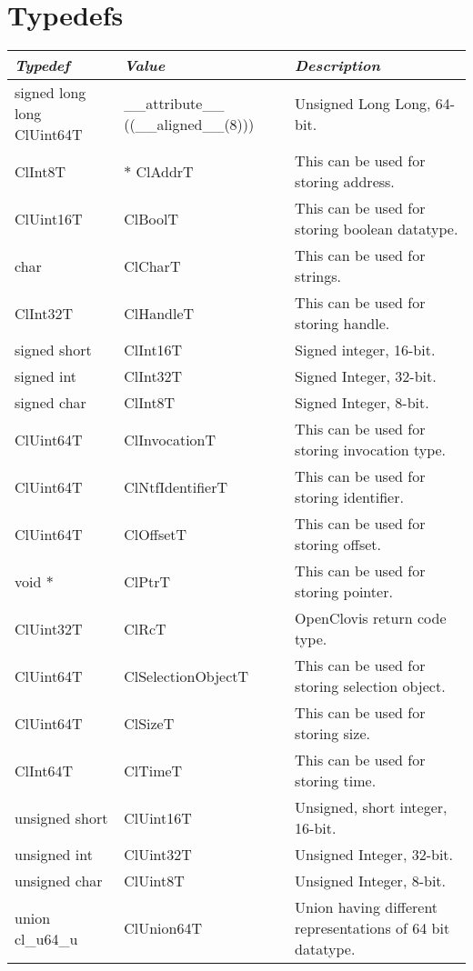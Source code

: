 \section{Typedefs}
\begin{tabular}{|p{2in}|p{1in}|p{2in}|} \hline
\textbf{\textit{Typedef}} &\textbf{\textit{Value}} &\textbf{\textit{Description}} \\\hline
signed long long Cl\-Uint64T &\_\-\_\-attribute\_\-\_\- ((\_\-\_\-aligned\_\-\_\-(8))) &Unsigned Long Long, 64-bit.\\
Cl\-Int8T &$\ast$ Cl\-Addr\-T &This can be used for storing address.\\
Cl\-Uint16T &Cl\-Bool\-T &This can be used for storing boolean datatype.\\
char &Cl\-Char\-T &This can be used for strings.\\
Cl\-Int32T &Cl\-Handle\-T &This can be used for storing handle.\\
signed short &Cl\-Int16T &Signed integer, 16-bit.\\
signed int &Cl\-Int32T &Signed Integer, 32-bit.\\
signed char &Cl\-Int8T &Signed Integer, 8-bit.\\
Cl\-Uint64T &Cl\-Invocation\-T &This can be used for storing invocation type.\\
Cl\-Uint64T &Cl\-Ntf\-Identifier\-T &This can be used for storing identifier.\\
Cl\-Uint64T &Cl\-Offset\-T &This can be used for storing offset.\\
void $\ast$ &Cl\-Ptr\-T &This can be used for storing pointer.\\
Cl\-Uint32T &Cl\-Rc\-T &OpenClovis return code type.\\
Cl\-Uint64T &Cl\-Selection\-Object\-T &This can be used for storing selection object.\\
Cl\-Uint64T &Cl\-Size\-T &This can be used for storing size.\\
Cl\-Int64T &Cl\-Time\-T &This can be used for storing time.\\
unsigned short &Cl\-Uint16T &Unsigned, short integer, 16-bit.\\
unsigned int &Cl\-Uint32T &Unsigned Integer, 32-bit.\\
unsigned char &Cl\-Uint8T &Unsigned Integer, 8-bit.\\
union cl\_\-u64\_\-u &Cl\-Union64T &Union having different representations of 64 bit datatype.\\\hline
\end{tabular}



